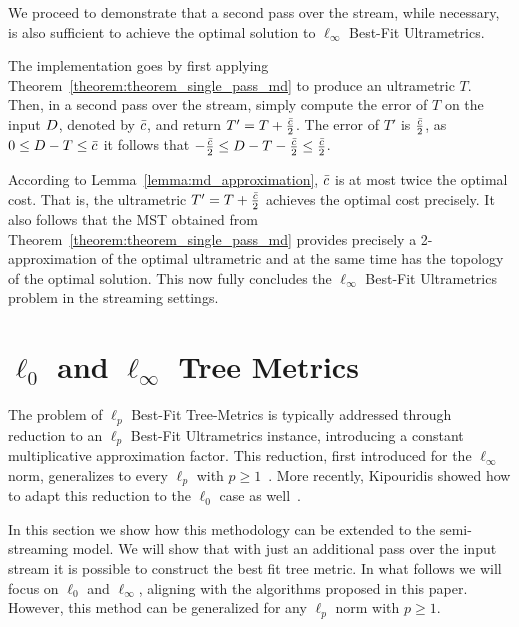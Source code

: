 \documentclass{article}
\begin{document}
\inftysinglepass*

We proceed to demonstrate that a second pass over the stream, while necessary, is also sufficient to achieve the optimal solution to $\ell_\infty$ Best-Fit Ultrametrics.

The implementation goes by first applying Theorem~\ref{theorem:theorem_single_pass_md} to produce an ultrametric $T$. Then, in a second pass over the stream, simply compute the error of $T$ on the input $D$, denoted by $\bar{c}$, and return $T'=T+\frac{\bar{c}}{2}$.
The error of $T'$ is $\frac{\bar{c}}{2}$, as $0 \leq D-T \leq \bar{c}$ it follows that $-\frac{\bar{c}}{2} \leq D -T -\frac{\bar{c}}{2} \leq \frac{\bar{c}}{2}$.

According to Lemma~\ref{lemma:md_approximation}, $\bar{c}$ is at most twice the optimal cost. That is, the ultrametric $T'=T+\frac{\bar{c}}{2}$ achieves the optimal cost precisely.
It also follows that the MST obtained from Theorem~\ref{theorem:theorem_single_pass_md} provides precisely a 2-approximation of the optimal ultrametric and at the same time has the topology of the optimal solution.
This now fully concludes the $\ell_\infty$ Best-Fit Ultrametrics problem in the streaming settings.

\twopass*

\section{\texorpdfstring{$\ell_0$ and $\ell_\infty$ Tree Metrics}{l-0 and l-inf Tree Metrics}} \label{section:trees}
\newcommand{\apivot}{a}
\newcommand{\centroid}{C^\apivot}
\newcommand{\zeronorm}[1]{\lVert #1 \rVert_0}

The problem of $\ell_p$ Best-Fit Tree-Metrics is typically addressed through reduction to an $\ell_p$ Best-Fit Ultrametrics instance, introducing a constant multiplicative approximation factor. This reduction, first introduced for the $\ell_\infty$ norm, generalizes to every $\ell_p$ with $p \geq 1$~\cite{agarwala}.
More recently, Kipouridis showed how to adapt this reduction to the $\ell_0$ case as well~\cite{kipouridis2023fitting}.

In this section we show how this methodology can be extended to the semi-streaming model. We will show that with just an additional pass over the input stream it is possible to construct the best fit tree metric. 
In what follows we will focus on $\ell_0$ and $\ell_\infty$, aligning with the algorithms proposed in this paper. However, this method can be generalized for any $\ell_p$ norm with $p \geq 1$.
\end{document}
